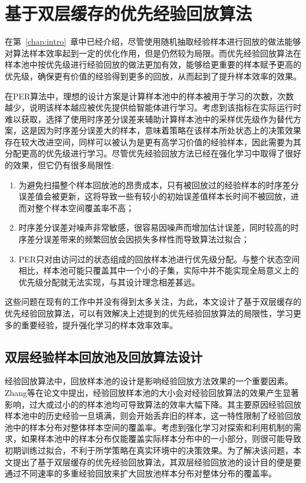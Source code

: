 
\chapter{基于双层缓存的优先经验回放算法}\label{chap:dper}

在第~\ref{chap:intro}~章中已经介绍，尽管使用随机抽取经验样本进行回放的做法能够对算法样本效率起到一定的优化作用，但是仍然较为局限。而优先经验回放算法在样本池中按优先级进行经验回放的做法更加有效，能够给更重要的样本赋予更高的优先级，确保更有价值的经验得到更多的回放，从而起到了提升样本效率的效果。

在PER算法中，理想的设计方案是计算样本池中的样本被用于学习的次数，次数越少，说明该样本越应被优先提供给智能体进行学习。考虑到该指标在实际运行时难以获取，选择了使用时序差分误差来辅助计算样本池中的采样优先级作为替代方案，这是因为时序差分误差大的样本，意味着策略在该样本所处状态上的决策效果存在较大改进空间，同样可以被认为是更有高学习价值的经验样本，因此需要为其分配更高的优先级进行学习。尽管优先经验回放方法已经在强化学习中取得了很好的效果，但它仍有很多局限性:

\begin{enumerate}[1）]
    \item 为避免扫描整个样本回放池的昂贵成本，只有被回放过的经验样本的时序差分误差值会被更新，这将导致一些有较小的初始误差值样本长时间不被回放，进而对整个样本空间覆盖率不高；
    \item 时序差分误差对噪声非常敏感，很容易因噪声而增加估计误差，同时较高的时序差分误差带来的频繁回放会因损失多样性而导致算法过拟合；
    \item PER只对由访问过的状态组成的回放样本池进行优先级分配。与整个状态空间相比，样本池可能只覆盖其中一个小的子集，实际中并不能实现全局意义上的优先级分配就无法实现，与其设计理念相差甚远。
\end{enumerate}

这些问题在现有的工作中并没有得到太多关注，为此，本文设计了基于双层缓存的优先经验回放算法，可以有效解决上述提到的优先经验回放算法的局限性，学习更多的重要经验，提升强化学习的样本效率效率。

\section{双层经验样本回放池及回放算法设计}

经验回放算法中，回放样本池的设计是影响经验回放方法效果的一个重要因素。Zhang等\cite{zhang2017deeper}在论文中提出，经验回放样本池的大小会对经验回放算法的效果产生显著影响，过大或过小的的样本池均可导致算法的效率大幅下降。其主要原因经验回放样本池中的历史经验一旦填满，则会开始丢弃旧的样本，这一特性限制了经验回放池中的样本分布对整体样本空间的覆盖率。考虑到强化学习对探索和利用机制的需求，如果样本池中的样本分布仅能覆盖实际样本分布中的一小部分，则很可能导致初期训练过拟合，不利于所学策略在真实环境中的决策效果。为了解决该问题，本文提出了基于双层缓存的优先经验回放算法，其双层经验回放池的设计目的便是要通过不同速率的多重经验回放来扩大回放池样本分布对整体分布的覆盖率。


